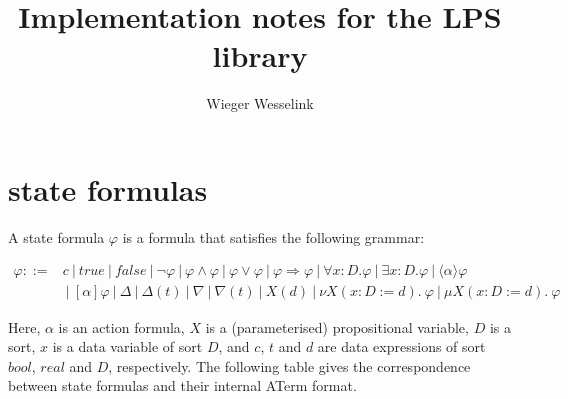 \documentclass[a4paper,10pt]{article}
\title{Implementation notes for the LPS library}
\author{Wieger Wesselink}
\begin{document}
\maketitle

\section{state formulas}

A state formula $\varphi$ is a formula that satisfies the following grammar:

\[
\begin{array}{lc}
\varphi ::= &
c
~|~ true
~|~ false
~|~ \neg \varphi
~|~ \varphi \wedge \varphi
~|~ \varphi \vee \varphi
~|~ \varphi \Rightarrow \varphi
~|~ \forall x{:}D .\varphi
~|~ \exists x{:}D .\varphi
~|~ \langle\alpha\rangle \varphi \\ &
~|~ [\alpha] \varphi
~|~ \Delta
~|~ \Delta(t)
~|~ \nabla
~|~ \nabla(t)
~|~ X(d)
~|~ \nu  X(x{:}D:=d).~\varphi
~|~ \mu  X(x{:}D:=d).~\varphi
\end{array}
\]

Here, $\alpha$ is an action formula, $X$ is a (parameterised) propositional variable, $D$ is a
sort, $x$ is a data variable of sort $D$, and $c$, $t$ and $d$ are data expressions of sort
$bool$, $real$ and $D$, respectively. The following table gives the correspondence between
state formulas and their internal ATerm format.
\end{document}
